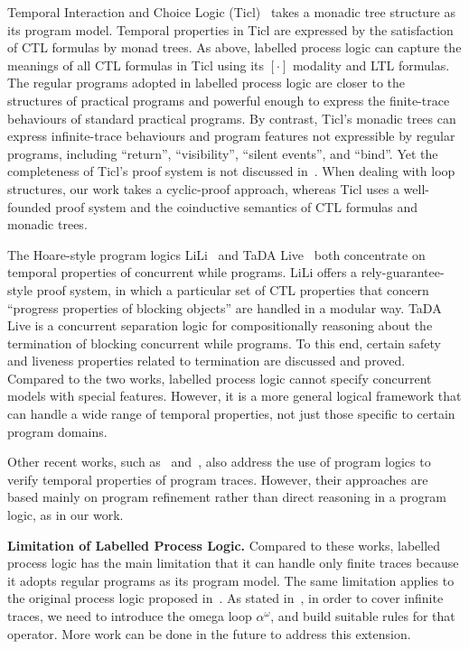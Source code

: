 \documentclass[manuscript,screen]{acmart}
\begin{document}
Temporal Interaction and Choice Logic (Ticl)~\cite{Ticl25} takes a monadic tree structure as its program model. 
Temporal properties in Ticl are expressed by the satisfaction of CTL formulas by monad trees. 
As above, labelled process logic can capture the meanings of all CTL formulas in Ticl using its $[\cdot]$ modality and LTL formulas. 
The regular programs adopted in labelled process logic are closer to the structures of practical programs and powerful enough to express the finite-trace behaviours of standard practical programs. 
By contrast, Ticl's monadic trees can express infinite-trace behaviours and program features not expressible by regular programs, including ``return'', ``visibility'', ``silent events'', and ``bind''. 
Yet the completeness of Ticl's proof system is not discussed in~\cite{Ticl25}. 
 When dealing with loop structures, our work takes a cyclic-proof approach, whereas Ticl uses a well-founded proof system and the coinductive semantics of CTL formulas and monadic trees. 

The Hoare-style program logics LiLi~\cite{LiLi16} and TaDA Live~\cite{TaDALive21} both concentrate on temporal properties of concurrent while programs. 
LiLi offers a rely-guarantee-style proof system, in which a particular set of CTL properties that concern ``progress properties of blocking objects'' are handled in a modular way. 
TaDA Live is a concurrent separation logic for compositionally reasoning about the termination of blocking concurrent while programs. 
To this end, certain safety and liveness properties related to termination are discussed and proved.
Compared to the two works, labelled process logic cannot specify concurrent models with special features. 
However, it is a more general logical framework that can handle a wide range of temporal properties, not just those specific to certain program domains. 

Other recent works, such as~\cite{Trillium24} and~\cite{Lawyer26}, also address the use of program logics to verify temporal properties of program traces. However, their approaches are based mainly on program refinement rather than direct reasoning in a program logic, as in our work. 

\textbf{Limitation of Labelled Process Logic.}
Compared to these works, labelled process logic has the main limitation that it can handle only finite traces because it adopts regular programs as its program model. 
The same limitation applies to the original process logic proposed in~\cite{Harel82}. 
As stated in~\cite{Harel00}, in order to cover infinite traces, we need to introduce the omega loop $\alpha^\omega$, and build suitable rules for that operator.  
More work can be done in the future to address this extension. 
\end{document}
